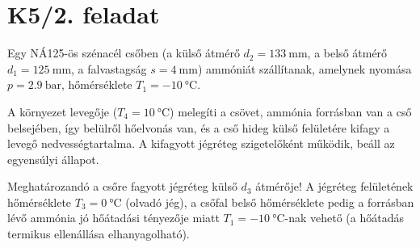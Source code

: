 

\section*{K5/2. feladat}
Egy NÁ125-ös szénacél csőben (a külső átmérő $d_2 = \SI{133}{\milli\meter}$, a belső átmérő $d_1 = \SI{125}{\milli\meter}$, a falvastagság $s = \SI{4}{\milli\meter}$) ammóniát szállítanak, amelynek nyomása $p = \SI{2.9}{\bar}$, hőmérséklete $T_1 = \SI{-10}{\celsius}$.

A környezet levegője ($T_4 = \SI{+10}{\celsius}$) melegíti a csövet, ammónia forrásban van a cső belsejében, így belülről hőelvonás van, és a cső hideg külső felületére kifagy a levegő nedvességtartalma. A kifagyott jégréteg szigetelőként működik, beáll az egyensúlyi állapot.

Meghatározandó a csőre fagyott jégréteg külső $d_3$ átmérője! A jégréteg felületének hőmérséklete $T_3 = \SI{0}{\celsius}$ (olvadó jég), a csőfal belső hőmérséklete pedig a forrásban lévő ammónia jó hőátadási tényezője miatt $T_1 = \SI{-10}{\celsius}$-nak vehető (a hőátadás termikus ellenállása elhanyagolható).

